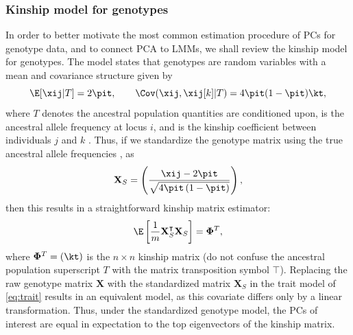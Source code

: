 \documentclass[11pt]{article}
\begin{document}

\subsubsection{Kinship model for genotypes}

In order to better motivate the most common estimation procedure of PCs for genotype data, and to connect PCA to LMMs, we shall review the kinship model for genotypes.
The model states that genotypes are random variables with a mean and covariance structure given by
$$
\E[ \xij | T ]
=
2 \pit,
\quad\quad
\Cov( \xij, \xij[k] | T )
=
4 \pit ( 1 - \pit ) \kt,
$$
where $T$ denotes the ancestral population quantities are conditioned upon, \pit is the ancestral allele frequency at locus $i$, and \kt is the kinship coefficient between individuals $j$ and $k$ \citep{malecot_mathematiques_1948, wright_genetical_1951, jacquard_structures_1970}.
Thus, if we standardize the genotype matrix using the true ancestral allele frequencies \pit, as
$$
\mathbf{X}_S
=
\left(
  \frac{
    \xij - 2 \pit
  }{
    \sqrt{4 \pit \left( 1 - \pit \right)}
  }
\right)
,
$$
then this results in a straightforward kinship matrix estimator:
$$
\E
\left[
\frac{1}{m}
\mathbf{X}_S^\intercal
\mathbf{X}_S
\right]
=
\mathbf{\Phi}^T
,
$$
where $\mathbf{\Phi}^T = ( \kt )$ is the $n \times n$ kinship matrix (do not confuse the ancestral population superscript $T$ with the matrix transposition symbol $\intercal$).
Replacing the raw genotype matrix $\mathbf{X}$ with the standardized matrix $\mathbf{X}_S$ in the trait model of \cref{eq:trait} results in an equivalent model, as this covariate differs only by a linear transformation.
Thus, under the standardized genotype model, the PCs of interest are equal in expectation to the top eigenvectors of the kinship matrix.
\end{document}
